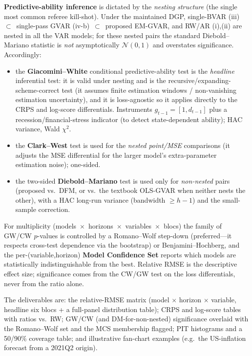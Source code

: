 \documentclass[11pt]{article}
\theoremstyle{definition}
\theoremstyle{remark}
\begin{document}
\textbf{Predictive-ability inference} is dictated by the \emph{nesting
structure} (the single most common referee kill-shot). Under the
maintained DGP, single-BVAR (iii)~$\subset$~single-pass GVAR
(iv-b)~$\subset$~proposed EM-GVAR, and RW/AR (i),(ii) are nested in all
the VAR models; for these nested pairs the standard Diebold--Mariano
statistic is \emph{not} asymptotically $\mathcal N(0,1)$ and overstates
significance. Accordingly:
\begin{itemize}
  \item the \textbf{Giacomini--White} conditional predictive-ability test
    \citep{GiacominiWhite2006} is the \emph{headline} inferential test: it
    is valid under nesting and is the recursive/expanding-scheme-correct
    test (it assumes finite estimation windows / non-vanishing estimation
    uncertainty), and it is loss-agnostic so it applies directly to the
    CRPS and log-score differentials. Instruments $g_{t-1}=[1,d_{t-1}]$
    plus a recession/financial-stress indicator (to detect
    state-dependent ability); HAC variance, Wald $\chi^2$.
  \item the \textbf{Clark--West} test \citep{ClarkWest2007} is used for the
    \emph{nested point/MSE} comparisons (it adjusts the MSE differential
    for the larger model's extra-parameter estimation noise); one-sided.
  \item the two-sided \textbf{Diebold--Mariano} test
    \citep{DieboldMariano1995} is used only for \emph{non-nested} pairs
    (proposed vs.\ DFM, or vs.\ the textbook OLS-GVAR when neither nests
    the other), with a HAC long-run variance (bandwidth $\ge h-1$) and the
    \citet{HarveyLeybourneNewbold1997} small-sample correction.
\end{itemize}
For multiplicity (models~$\times$~horizons~$\times$~variables~$\times$~blocs)
the family of GW/CW $p$-values is controlled by a Romano--Wolf step-down
\citep{RomanoWolf2005} (preferred---it respects cross-test dependence via
the bootstrap) or Benjamini--Hochberg, and the per-(variable,horizon)
\textbf{Model Confidence Set} \citep{HansenLundeNason2011} reports which
models are statistically indistinguishable from the best. Relative RMSE is
the descriptive effect size; significance comes from the CW/GW test on the
loss differentials, never from the ratio alone.

The deliverables are: the relative-RMSE matrix (model $\times$ horizon
$\times$ variable, headline six blocs + a full-panel distribution table);
CRPS and log-score tables with ratios vs.\ RW; GW/CW (and DM-for-non-nested)
significance overlaid with the Romano--Wolf set and the MCS membership
flagged; PIT histograms and a 50/90\% coverage table; and illustrative
fan-chart examples (e.g.\ the US-inflation forecast from a 2021Q2 origin).
\end{document}
